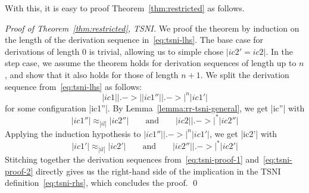 With this, it is easy to proof Theorem~\ref{thm:restricted} as follows.
\begin{proof}[Proof of Theorem~\ref{thm:restricted}, TSNI]
  We proof the theorem by induction on the length of the derivation sequence in~\eqref{eq:tsni-lhs}.
  The base case for derivations
  of length 0 is trivial, allowing
  us to simple chose $|ic2'=ic2|$.  In the step case, we assume
  the theorem holds for derivation sequences of length up to $n$, and show that it also
  holds for those of length $n+1$.  We split the derivation sequence from~\eqref{eq:tsni-lhs} as follows:
  \[
  |ic1| |.->| |ic1''| |.->|^n |ic1'|
  \]
  for some configuration |ic1''|.  By Lemma~\ref{lemma:rr-tsni-general}, we get
  |ic''| with
  \begin{equation} \label{eq:tsni-proof-1}
  |ic1''| \approx_{|il|} |ic2''|
  \qquad \text{and} \qquad
  |ic2| |.->|^* |ic2''|
  \end{equation}
  Applying the induction hypothesis to
  $|ic1''| |.->|^n |ic1'|$, we get |ic2'| with
  \begin{equation} \label{eq:tsni-proof-2}
  |ic1'| \approx_{|il|} |ic2'|
  \qquad \text{and} \qquad
  |ic2''| |.->|^* |ic2'|
  \end{equation}
  Stitching together the derivation sequences from~\eqref{eq:tsni-proof-1} and~\eqref{eq:tsni-proof-2} directly gives
  us the right-hand side of the implication in the TSNI
  definition~\eqref{eq:tsni-rhs}, which concludes the proof.
  \qed
\end{proof}







